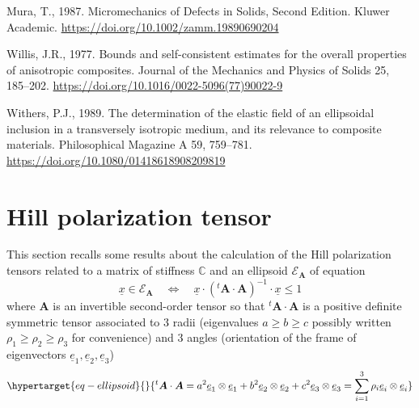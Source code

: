 \documentclass[
  letterpaper,
  DIV=11,
  numbers=noendperiod]{scrreprt}
\newlength{\cslhangindent}
\newlength{\cslentryspacingunit} %
\newenvironment{CSLReferences}[2] %
 {%
  \setlength{\parindent}{0pt}
  \ifodd #1
  \let\oldpar\par
  \def\par{\hangindent=\cslhangindent\oldpar}
  \fi
  \setlength{\parskip}{#2\cslentryspacingunit}
 }%
 {}
\begin{document}
\begin{CSLReferences}{1}{0}
\leavevmode{}%
Mura, T., 1987. Micromechanics of {Defects} in {Solids}, {Second
Edition}. {Kluwer Academic}.
\url{https://doi.org/10.1002/zamm.19890690204}

\leavevmode{}%
Willis, J.R., 1977. Bounds and self-consistent estimates for the overall
properties of anisotropic composites. Journal of the Mechanics and
Physics of Solids 25, 185--202.
\url{https://doi.org/10.1016/0022-5096(77)90022-9}

\leavevmode{}%
Withers, P.J., 1989. The determination of the elastic field of an
ellipsoidal inclusion in a transversely isotropic medium, and its
relevance to composite materials. Philosophical Magazine A 59, 759--781.
\url{https://doi.org/10.1080/01418618908209819}

\end{CSLReferences}

\appendix
{}

\hypertarget{hill-polarization-tensor}{%
\chapter{Hill polarization tensor}\label{hill-polarization-tensor}}

This section recalls some results about the calculation of the Hill
polarization tensors related to a matrix of stiffness \(\mathbb{C}\) and
an ellipsoid \(\mathcal{E}_{{\mathbf{\boldsymbol{{A}}}}}\) of equation
\[
{\underline{{x}}}\in\mathcal{E}_{{\mathbf{\boldsymbol{{A}}}}}
\quad\Leftrightarrow\quad
{\underline{{x}}}\cdot({{}^{t}{{\mathbf{\boldsymbol{{A}}}}}}\cdot{\mathbf{\boldsymbol{{A}}}})^{-1}\cdot{\underline{{x}}}\leq 1
\] where \({\mathbf{\boldsymbol{{A}}}}\) is an invertible second-order
tensor so that
\({{}^{t}{{\mathbf{\boldsymbol{{A}}}}}}\cdot{\mathbf{\boldsymbol{{A}}}}\)
is a positive definite symmetric tensor associated to 3 radii
(eigenvalues \(a\geq b \geq c\) possibly written
\(\rho_1 \geq \rho_2 \geq \rho_3\) for convenience) and 3 angles
(orientation of the frame of eigenvectors
\({\underline{{e}}}_1, {\underline{{e}}}_2, {\underline{{e}}}_3\))
\begin{equation}\protect\hypertarget{eq-ellipsoid}{}{
{{}^{t}{{\mathbf{\boldsymbol{{A}}}}}}\cdot{\mathbf{\boldsymbol{{A}}}}=a^2 {\underline{{e}}}_1\otimes{\underline{{e}}}_1 + b^2 {\underline{{e}}}_2\otimes{\underline{{e}}}_2 + c^2 {\underline{{e}}}_3\otimes{\underline{{e}}}_3 = \sum_{i=1}^3 \rho_i {\underline{{e}}}_i\otimes{\underline{{e}}}_i
}\label{eq-ellipsoid}\end{equation}
\end{document}
